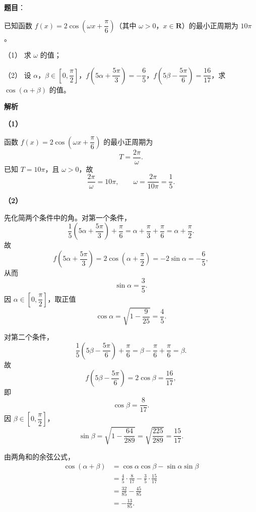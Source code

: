 \begin{answer}

\textbf{题目}：

已知函数 $f(x)=2\cos\left(\omega x+\dfrac\pi6\right)$（其中 $\omega>0$，$x\in\mathbf R$）的最小正周期为 $10\pi$。

（1） 求 $\omega$ 的值；

（2） 设 $\alpha$，$\beta\in\left[0,\dfrac\pi2\right]$，$f\left(5\alpha+\dfrac{5\pi}{3}\right)=-\dfrac65$，$f\left(5\beta-\dfrac{5\pi}{6}\right)=\dfrac{16}{17}$，求 $\cos(\alpha+\beta)$ 的值。

\textbf{解析}

\textbf{（1）}

函数 $f(x)=2\cos\left(\omega x+\dfrac\pi6\right)$ 的最小正周期为
\nopagebreak[4]
\[T=\frac{2\pi}{\omega}.\]
已知 $T=10\pi$，且 $\omega>0$，故
\nopagebreak[4]
\[\frac{2\pi}{\omega}=10\pi,\qquad \omega=\frac{2\pi}{10\pi}=\frac15.\]

\textbf{（2）}

先化简两个条件中的角。对第一个条件，
\nopagebreak[4]
\[\frac15\left(5\alpha+\frac{5\pi}{3}\right)+\frac\pi6
=\alpha+\frac\pi3+\frac\pi6
=\alpha+\frac\pi2.\]
故
\nopagebreak[4]
\[f\left(5\alpha+\frac{5\pi}{3}\right)
=2\cos\left(\alpha+\frac\pi2\right)
=-2\sin\alpha=-\frac65,\]
从而
\nopagebreak[4]
\[\sin\alpha=\frac35.\]
因 $\alpha\in\left[0,\dfrac\pi2\right]$，取正值
\nopagebreak[4]
\[\cos\alpha=\sqrt{1-\frac9{25}}=\frac45.\]

对第二个条件，
\nopagebreak[4]
\[\frac15\left(5\beta-\frac{5\pi}{6}\right)+\frac\pi6
=\beta-\frac\pi6+\frac\pi6=\beta.\]
故
\nopagebreak[4]
\[f\left(5\beta-\frac{5\pi}{6}\right)=2\cos\beta=\frac{16}{17},\]
即
\nopagebreak[4]
\[\cos\beta=\frac8{17}.\]
因 $\beta\in\left[0,\dfrac\pi2\right]$，
\nopagebreak[4]
\[\sin\beta=\sqrt{1-\frac{64}{289}}=\sqrt{\frac{225}{289}}=\frac{15}{17}.\]

由两角和的余弦公式，
\nopagebreak[4]
\[\begin{aligned}
\cos(\alpha+\beta)
&=\cos\alpha\cos\beta-\sin\alpha\sin\beta\\
&=\frac45\cdot\frac8{17}-\frac35\cdot\frac{15}{17}\\
&=\frac{32}{85}-\frac{45}{85}\\
&=-\frac{13}{85}.
\end{aligned}\]



\end{answer}
